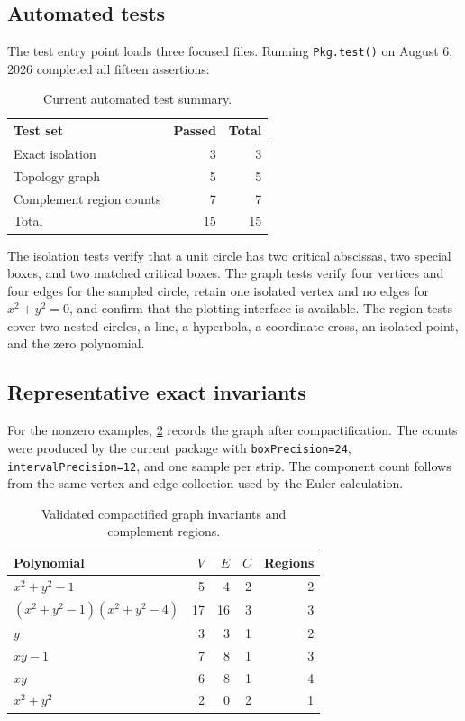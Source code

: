 \documentclass[11pt,a4paper]{article}
\begin{document}
\subsection{Automated tests}

The test entry point loads three focused files. Running
\texttt{Pkg.test()} on August 6, 2026 completed all fifteen assertions:

\begin{table}[htbp]
\centering
\caption{Current automated test summary.}
\label{tab:test-summary}
\begin{tabular}{@{}lrr@{}}
\toprule
Test set & Passed & Total \\
\midrule
Exact isolation & 3 & 3 \\
Topology graph & 5 & 5 \\
Complement region counts & 7 & 7 \\
\midrule
Total & 15 & 15 \\
\bottomrule
\end{tabular}
\end{table}

The isolation tests verify that a unit circle has two critical abscissas, two
special boxes, and two matched critical boxes. The graph tests verify four
vertices and four edges for the sampled circle, retain one isolated vertex and
no edges for $x^2+y^2=0$, and confirm that the plotting interface is available.
The region tests cover two nested circles, a line, a hyperbola, a coordinate
cross, an isolated point, and the zero polynomial.

\subsection{Representative exact invariants}

For the nonzero examples, \cref{tab:cases} records the graph after
compactification. The counts were produced by the current package with
\texttt{boxPrecision=24}, \texttt{intervalPrecision=12}, and one sample per
strip. The component count follows from the same vertex and edge collection
used by the Euler calculation.

\begin{table}[htbp]
\centering
\caption{Validated compactified graph invariants and complement regions.}
\label{tab:cases}
\begin{tabularx}{\textwidth}{@{}Xrrrr@{}}
\toprule
Polynomial & $V$ & $E$ & $C$ & Regions \\
\midrule
$x^2+y^2-1$ & 5 & 4 & 2 & 2 \\
$(x^2+y^2-1)(x^2+y^2-4)$ & 17 & 16 & 3 & 3 \\
$y$ & 3 & 3 & 1 & 2 \\
$xy-1$ & 7 & 8 & 1 & 3 \\
$xy$ & 6 & 8 & 1 & 4 \\
$x^2+y^2$ & 2 & 0 & 2 & 1 \\
\bottomrule
\end{tabularx}
\end{table}
\end{document}
